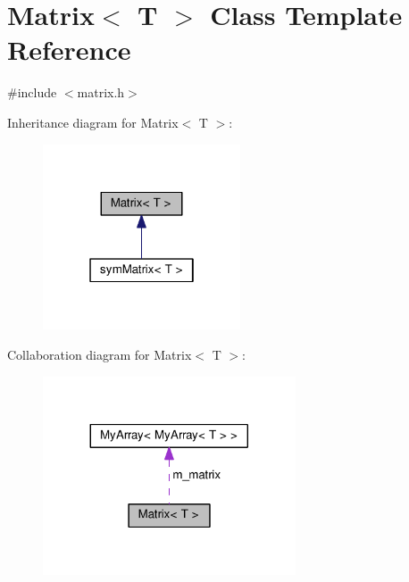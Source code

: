 \hypertarget{classMatrix}{}\section{Matrix$<$ T $>$ Class Template Reference}
\label{classMatrix}


{\ttfamily \#include $<$matrix.\+h$>$}



Inheritance diagram for Matrix$<$ T $>$\+:\nopagebreak
\begin{figure}[H]
\begin{center}
\leavevmode
\includegraphics[width=166pt]{classMatrix__inherit__graph}
\end{center}
\end{figure}


Collaboration diagram for Matrix$<$ T $>$\+:\nopagebreak
\begin{figure}[H]
\begin{center}
\leavevmode
\includegraphics[width=212pt]{classMatrix__coll__graph}
\end{center}
\end{figure}
